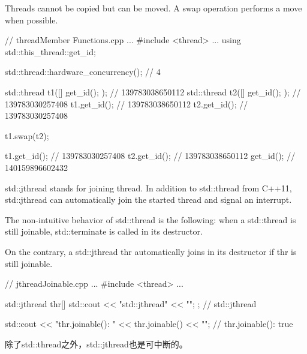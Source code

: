 Threads cannot be copied but can be moved. A swap operation performs a move when possible.


\begin{cpp}
// threadMember Functions.cpp
...
#include <thread>
...
using std::this_thread::get_id;

std::thread::hardware_concurrency(); // 4

std::thread t1([]{ get_id(); }); // 139783038650112
std::thread t2([]{ get_id(); }); // 139783030257408
t1.get_id(); // 139783038650112
t2.get_id(); // 139783030257408

t1.swap(t2);

t1.get_id(); // 139783030257408
t2.get_id(); // 139783038650112
get_id(); // 140159896602432
\end{cpp}


std::jthread stands for joining thread. In addition to std::thread from C++11, std::jthread can automatically join the started thread and signal an interrupt.


The non-intuitive behavior of std::thread is the following: when a std::thread is still joinable, std::terminate is called in its destructor.

On the contrary, a std::jthread thr automatically joins in its destructor if thr is still joinable.


\begin{cpp}
// jthreadJoinable.cpp
...
#include <thread>
...

std::jthread thr{[]{ std::cout << "std::jthread" << "\n"; }}; // std::jthread

std::cout << "thr.joinable(): " << thr.joinable() << "\n"; // thr.joinable(): true
\end{cpp}

除了std::thread之外，std::jthread也是可中断的。














